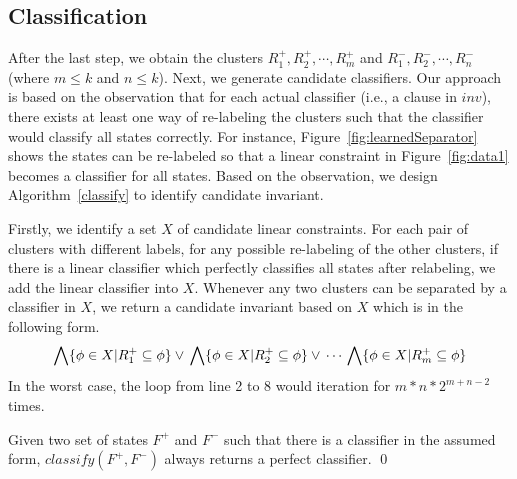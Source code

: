 
\subsection{Classification}
After the last step, we obtain the clusters $R^+_1, R^+_2, \cdots, R^+_m$ and $R^-_1, R^-_2, \cdots, R^-_n$ (where $m \leq k$ and $n \leq k$). Next, we generate candidate classifiers. Our approach is based on the observation that for each actual classifier (i.e., a clause in $inv$), there exists at least one way of re-labeling the clusters such that the classifier would classify all states correctly. For instance, Figure~\ref{fig:learnedSeparator} shows the states can be re-labeled so that a linear constraint in Figure~\ref{fig:data1} becomes a classifier for all states. Based on the observation, we design Algorithm~\ref{classify} to identify candidate invariant.

Firstly, we identify a set $X$ of candidate linear constraints. For each pair of clusters with different labels, for any possible re-labeling of the other clusters, if there is a linear classifier which perfectly classifies all states after relabeling, we add the linear classifier into $X$. Whenever any two clusters can be separated by a classifier in $X$, we return a candidate invariant based on $X$ which is in the following form.
\[
    \bigwedge \{ \phi \in X | R^+_1 \subseteq \phi \} \lor \\
    \bigwedge \{ \phi \in X | R^+_2 \subseteq \phi \} \lor \\
    \cdots \\
    \bigwedge \{ \phi \in X | R^+_m \subseteq \phi \}
\]
In the worst case, the loop from line 2 to 8 would iteration for $m*n*2^{m+n-2}$ times.

\begin{example}

\end{example}

\begin{proposition}
Given two set of states $F^+$ and $F^-$ such that there is a classifier in the assumed form, $classify(F^+,F^-)$ always returns a perfect classifier. \hfill \qed
\end{proposition}

